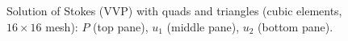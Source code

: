 \begin{figure}[hbh]
\begin{center}
\caption{Solution of Stokes (VVP) with quads and triangles (cubic elements, $16 \times 16$ mesh):
$P$ (top pane),
$u_{1}$ (middle pane),
$u_{2}$ (bottom pane).}
\label{NVR:fig:Stokes}
\end{center}\end{figure}
